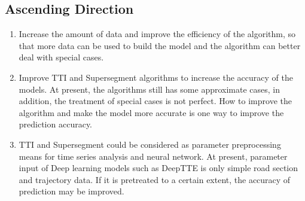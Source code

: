 \documentclass[fontset=none]{ctexart}
\theoremstyle{definition}
\theoremstyle{remark}
\begin{document}
\subsection{Ascending Direction}
\begin{enumerate}
  \item Increase the amount of data and improve the efficiency of the algorithm, so that more data can be used to build the model and the algorithm can better deal with special cases.
  \item Improve TTI and Supersegment algorithms to increase the accuracy of the models. At present, the algorithms still has some approximate cases, in addition, the treatment of special cases is not perfect. How to improve the algorithm and make the model more accurate is one way to improve the prediction accuracy.
  \item TTI and Supersegment could be considered as parameter preprocessing means for time series analysis and neural network. At present, parameter input of Deep learning models such as DeepTTE is only simple road section and trajectory data. If it is pretreated to a certain extent, the accuracy of prediction may be improved.
\end{enumerate}

% 
% 
\end{document}
